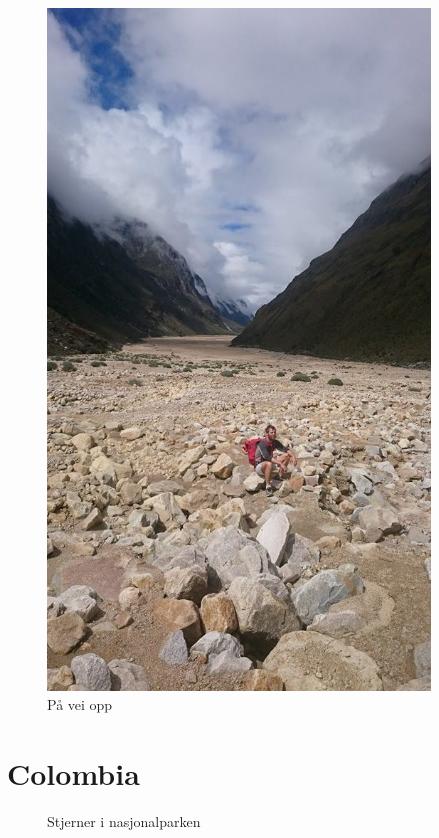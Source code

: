 \begin{figure}[!h]
	\centering
	\includegraphics[width=4in]{akselidalen}
	\caption*{På vei opp}
\label{fig:akselidalen}
\end{figure}

\clearpage
\section{Colombia}

\begin{figure}[!h]
	\centering
\noindent{}
	\caption*{Stjerner i nasjonalparken}
\label{fig:colombia}
\end{figure}

